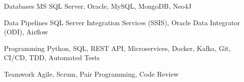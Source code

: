 


\begin{cvskills}


\cvskill
{Databases} %
{MS SQL Server, Oracle, MySQL, MongoDB, Neo4J} %

\cvskill
{Data Pipelines} %
{SQL Server Integration Services (SSIS), Oracle Data Integrator (ODI), Airflow} %

\cvskill
{Programming} %
{Python, SQL, REST API, Microservices, Docker, Kafka, Git, CI/CD, TDD, Automated Tests} %


\cvskill
{Teamwork} %
{Agile, Scrum, Pair Programming, Code Review} %


\end{cvskills}
